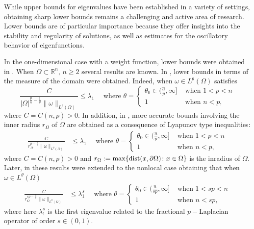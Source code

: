 \documentclass[12pt,reqno]{amsart}
\theoremstyle{definition}
\theoremstyle{remark}
\numberwithin{equation}{section}
\def\dist{\mathop{\text{\normalfont dist}}}
\begin{document}
While upper bounds for eigenvalues have been established in a variety of settings, obtaining sharp lower bounds remains a challenging and active area of research. Lower bounds are of particular importance because they offer insights into the stability and regularity of solutions, as well as estimates for the oscillatory behavior of eigenfunctions.



In the one-dimensional case  with a weight function, lower bounds were obtained in \cite{E, LYHA,P,Pi, SL}. When $\Omega\subset \mathbb{R}^n$, $n\geq 2$ several results are known. In \cite{AL,C},  lower bounds in terms of the measure of the domain were obtained. Indeed,  when $\omega\in L^\theta(\Omega)$ satisfies
\begin{equation*}
\frac{C}{|\Omega|^{\frac{p}{n}-\frac{1}{\theta}} \|\omega\|_{L^\theta(\Omega)} } \leq \lambda_1\quad \text{ where } \theta=\begin{cases} \theta_0\in (\frac{n}{p},\infty] &\text{ when } 1<p< n\\ 1  &\text{ when }n<p,
\end{cases}
\end{equation*}
where $C=C(n,p)>0$.
In addition, in \cite{DNP, Pi}, more accurate bounds involving the inner radius $r_\Omega$ of $\Omega$ are obtained as a consequence of Lyapunov type inequalities:
\begin{align} \label{ineq.s1}
\frac{C}{r_\Omega^{p-\frac{n}{\theta}} \|\omega\|_{L^\theta (\Omega)} }&\leq \lambda_1 \quad
\text{ where } \theta=\begin{cases} \theta_0\in (\frac{n}{p},\infty] &\text{ when } 1<p< n\\ 1  &\text{ when }n<p,
\end{cases}
\end{align}
where $C=C(n,p)>0$ and $r_\Omega:=\max\{\dist(x,\partial\Omega)\colon x\in\Omega\}$ is the inradius of $\Omega$. Later, in \cite{JKS} these results were extended to the nonlocal case obtaining that when $\omega \in L^\theta(\Omega)$
\begin{align} \label{ineq.s1}
\frac{C}{r_\Omega^{sp-\frac{n}{\theta}} \|\omega\|_{L^\theta (\Omega)} }&\leq \lambda_1^s \quad
\text{ where } \theta=\begin{cases} \theta_0\in (\frac{n}{sp},\infty] &\text{ when } 1<sp< n\\ 1  &\text{ when }n<sp,\end{cases}
\end{align}
where here $\lambda_1^s$ is the first eigenvalue related to the fractional $p-$Laplacian operator of order $s\in (0,1)$.
\end{document}
